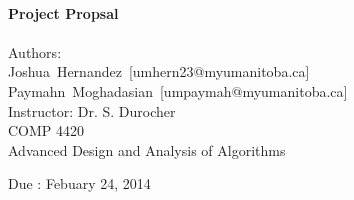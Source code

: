 \documentclass[12pt]{report}
\makeatletter
\newcommand{\texTitle}{Project Propsal}
\newcommand{\dueDate}{Febuary 24, 2014}
\newcommand{\class}{COMP 4420}
\newcommand{\classTitle}{Advanced Design and Analysis of Algorithms}
\newcommand{\classInstructor}{Dr. S. Durocher}
\newcommand{\authorNameA}{Joshua\ Hernandez}
\newcommand{\emailA}{umhern23@myumanitoba.ca}
\newcommand{\authorNameB}{Paymahn\ Moghadasian}
\newcommand{\emailB}{umpaymah@myumanitoba.ca}
\makeatother
\begin{document}
	\begin{titlepage}
		\begin{center}
			~~ \\[0.4cm]

			{\LARGE \bfseries \texTitle }\\[0.4cm]

			~~ \\[1.5cm]

			\normalsize
			Authors: \\
			\authorNameA \ [\emailA] \\[.5cm]
			\authorNameB \ [\emailB] \\[.5cm]
			Instructor: \classInstructor \\[1.5cm]

			\class \\[.125cm]
			\classTitle \\[1.5cm]

			\vfill

			{Due : \dueDate}
		\end{center}
	\end{titlepage}
	\newpage

\end{document}
